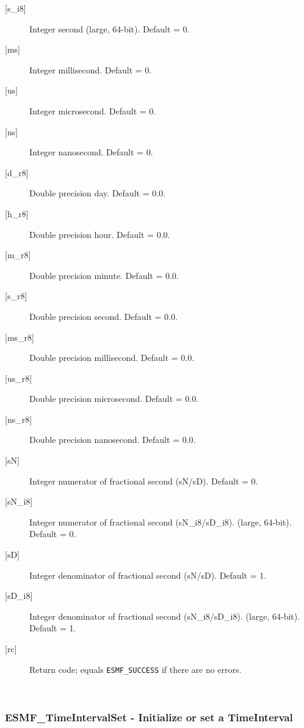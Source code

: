 \begin{description}
       \item[{[s\_i8]}]
            Integer second (large, 64-bit).  Default = 0.
       \item[{[ms]}]
            Integer millisecond.  Default = 0.
       \item[{[us]}]
            Integer microsecond.  Default = 0.
       \item[{[ns]}]
            Integer nanosecond.  Default = 0.
       \item[{[d\_r8]}]
            Double precision day.  Default = 0.0.
       \item[{[h\_r8]}]
            Double precision hour.  Default = 0.0.
       \item[{[m\_r8]}]
            Double precision minute.  Default = 0.0.
       \item[{[s\_r8]}]
            Double precision second.  Default = 0.0.
       \item[{[ms\_r8]}]
            Double precision millisecond.  Default = 0.0.
       \item[{[us\_r8]}]
            Double precision microsecond.  Default = 0.0.
       \item[{[ns\_r8]}]
            Double precision nanosecond.  Default = 0.0.
       \item[{[sN]}]
            Integer numerator of fractional second (sN/sD).
            Default = 0.
       \item[{[sN\_i8]}]
            Integer numerator of fractional second (sN\_i8/sD\_i8).
                                                             (large, 64-bit).
            Default = 0.
       \item[{[sD]}]
            Integer denominator of fractional second (sN/sD).
            Default = 1.
       \item[{[sD\_i8]}]
            Integer denominator of fractional second (sN\_i8/sD\_i8).
                                                             (large, 64-bit).
            Default = 1.
       \item[{[rc]}]
            Return code; equals {\tt ESMF\_SUCCESS} if there are no errors.
       \end{description}
   
 
\mbox{}\hrulefill\ 
 
\subsubsection [ESMF\_TimeIntervalSet] {ESMF\_TimeIntervalSet - Initialize or set a TimeInterval}


